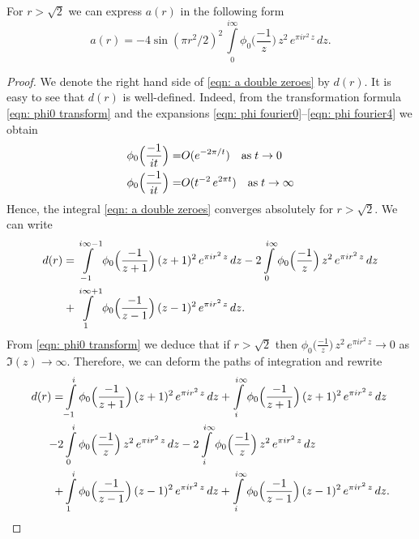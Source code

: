 \begin{proposition}\label{prop: a(r) double zeroes}
For $r>\sqrt{2}$ we can express $a(r)$ in the following form
\begin{equation}\label{eqn: a double zeroes}
  a(r)=-4\sin(\pi r^2/2)^2\,\int\limits_{0}^{i\infty}\phi_0\Big(\frac{-1}{z}\Big)\,z^2\,e^{\pi i r^2 \,z}\,dz.
\end{equation}
\end{proposition}
\begin{proof}
We denote the right hand side of \eqref{eqn: a double zeroes} by $d(r)$.  It is easy to see that $d(r)$ is well-defined. Indeed, from the transformation formula \eqref{eqn: phi0 transform} and the expansions \eqref{eqn: phi fourier0}--\eqref{eqn: phi fourier4} we obtain
\begin{align}
\phi_0\Big(\frac{-1}{it}\Big)=&O(e^{-2\pi/t})\quad\mbox{as}\;t\to 0\notag\\
\phi_0\Big(\frac{-1}{it}\Big)=&O(t^{-2}\,e^{2\pi t})\quad\mbox{as}\;t\to \infty\notag
\end{align}
Hence, the integral \eqref{eqn: a double zeroes} converges absolutely for $r>\sqrt{2}$.
  We can write %
\begin{align}
  d(r)=&\int\limits_{-1}^{i\infty-1}\phi_0\Big(\frac{-1}{z+1}\Big)\,(z+1)^2\,e^{\pi i r^2 \,z}\,dz-
  2\int\limits_{0}^{i\infty}\phi_0\Big(\frac{-1}{z}\Big)\,z^2\,e^{\pi i r^2 \,z}\,dz\notag\\
  +&\int\limits_{1}^{i\infty+1}\phi_0\Big(\frac{-1}{z-1}\Big)\,(z-1)^2\,e^{\pi i r^2 \,z}\,dz.\notag
\end{align}
From \eqref{eqn: phi0 transform} we deduce that if $r>\sqrt{2}$ then
$\phi_0\Big(\frac{-1}{z}\Big)\,z^2\,e^{\pi i r^2 \,z}\to 0$ as $\Im(z)\to\infty$. Therefore, we can deform the paths of integration
and rewrite
\begin{align}
  d(r)=&\int\limits_{-1}^{i}\phi_0\Big(\frac{-1}{z+1}\Big)\,(z+1)^2\,e^{\pi i r^2 \,z}\,dz
  +\int\limits_{i}^{i\infty}\phi_0\Big(\frac{-1}{z+1}\Big)\,(z+1)^2\,e^{\pi i r^2 \,z}\,dz\notag\\
  -2&\int\limits_{0}^{i}\phi_0\Big(\frac{-1}{z}\Big)\,z^2\,e^{\pi i r^2 \,z}\,dz
  -2\int\limits_{i}^{i\infty}\phi_0\Big(\frac{-1}{z}\Big)\,z^2\,e^{\pi i r^2 \,z}\,dz\notag\\
  +&\int\limits_{1}^{i}\phi_0\Big(\frac{-1}{z-1}\Big)\,(z-1)^2\,e^{\pi i r^2 \,z}\,dz
  +\int\limits_{i}^{i\infty}\phi_0\Big(\frac{-1}{z-1}\Big)\,(z-1)^2\,e^{\pi i r^2 \,z}\,dz.\notag
\end{align}

\end{proof}
